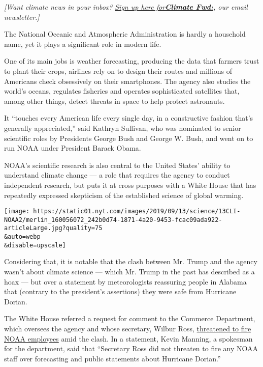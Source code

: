 \emph{{[}Want climate news in your inbox?}
\href{https://www.nytimes.com/newsletters/climate-change}{\emph{Sign up
here
for}}\textbf{\href{https://www.nytimes.com/newsletters/climate-change}{\emph{Climate
Fwd:}}}\emph{, our email newsletter.{]}}

The National Oceanic and Atmospheric Administration is hardly a
household name, yet it plays a significant role in modern life.

One of its main jobs is weather forecasting, producing the data that
farmers trust to plant their crops, airlines rely on to design their
routes and millions of Americans check obsessively on their smartphones.
The agency also studies the world's oceans, regulates fisheries and
operates sophisticated satellites that, among other things, detect
threats in space to help protect astronauts.

It ``touches every American life every single day, in a constructive
fashion that's generally appreciated,'' said Kathryn Sullivan, who was
nominated to senior scientific roles by Presidents George Bush and
George W. Bush, and went on to run NOAA under President Barack Obama.

NOAA's scientific research is also central to the United States' ability
to understand climate change --- a role that requires the agency to
conduct independent research, but puts it at cross purposes with a White
House that has repeatedly expressed skepticism of the established
science of global warming.

\texttt{[image: https://static01.nyt.com/images/2019/09/13/science/13CLI-NOAA2/merlin\_160056072\_242b0d74-1871-4a20-9453-fcac09ada922-articleLarge.jpg?quality=75\\\&auto=webp\\\&disable=upscale]}

Considering that, it is notable that the clash between Mr. Trump and the
agency wasn't about climate science --- which Mr. Trump in the past has
described as a hoax --- but over a statement by meteorologists
reassuring people in Alabama that (contrary to the president's
assertions) they were safe from Hurricane Dorian.

The White House referred a request for comment to the Commerce
Department, which oversees the agency and whose secretary, Wilbur Ross,
\href{https://www.nytimes.com/2019/09/09/climate/hurricane-dorian-trump-tweet.html?rref=collection\%2Fbyline\%2Fchristopher-flavelle\&action=click\&contentCollection=undefined\&region=stream\&module=stream_unit\&version=latest\&contentPlacement=6\&pgtype=collection}{threatened
to fire NOAA employees} amid the clash. In a statement, Kevin Manning, a
spokesman for the department, said that ``Secretary Ross did not
threaten to fire any NOAA staff over forecasting and public statements
about Hurricane Dorian.''

